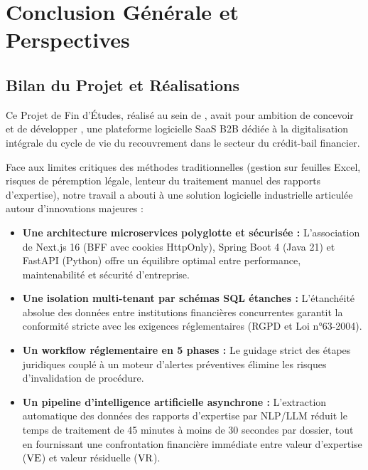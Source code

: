 
\chapter*{Conclusion Générale et Perspectives}

\section*{Bilan du Projet et Réalisations}

Ce Projet de Fin d'Études, réalisé au sein de \textbf{\hostCompany}, avait pour ambition de concevoir et de développer \textbf{\projectShortTitle}, une plateforme logicielle SaaS B2B dédiée à la digitalisation intégrale du cycle de vie du recouvrement dans le secteur du crédit-bail financier.

Face aux limites critiques des méthodes traditionnelles (gestion sur feuilles Excel, risques de péremption légale, lenteur du traitement manuel des rapports d'expertise), notre travail a abouti à une solution logicielle industrielle articulée autour d'innovations majeures :
\begin{itemize}
    \item \textbf{Une architecture microservices polyglotte et sécurisée :} L'association de Next.js 16 (BFF avec cookies HttpOnly), Spring Boot 4 (Java 21) et FastAPI (Python) offre un équilibre optimal entre performance, maintenabilité et sécurité d'entreprise.
    \item \textbf{Une isolation multi-tenant par schémas SQL étanches :} L'étanchéité absolue des données entre institutions financières concurrentes garantit la conformité stricte avec les exigences réglementaires (RGPD et Loi n°63-2004).
    \item \textbf{Un workflow réglementaire en 5 phases :} Le guidage strict des étapes juridiques couplé à un moteur d'alertes préventives élimine les risques d'invalidation de procédure.
    \item \textbf{Un pipeline d'intelligence artificielle asynchrone :} L'extraction automatique des données des rapports d'expertise par NLP/LLM réduit le temps de traitement de 45 minutes à moins de 30 secondes par dossier, tout en fournissant une confrontation financière immédiate entre valeur d'expertise ($\text{VE}$) et valeur résiduelle ($\text{VR}$).
\end{itemize}

